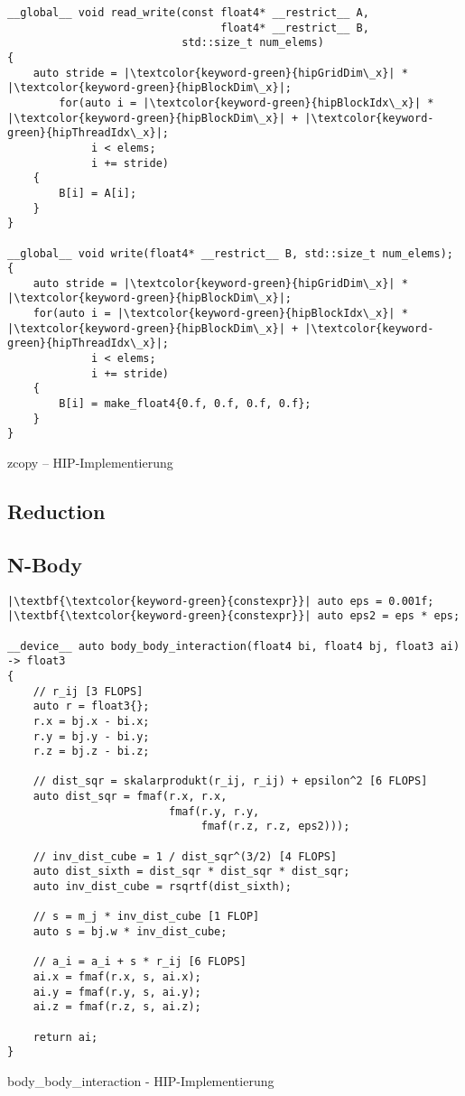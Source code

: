 \begin{code}
    \begin{verbatim}
__global__ void read_write(const float4* __restrict__ A,
                                 float4* __restrict__ B,
                           std::size_t num_elems)
{
    auto stride = |\textcolor{keyword-green}{hipGridDim\_x}| * |\textcolor{keyword-green}{hipBlockDim\_x}|;
        for(auto i = |\textcolor{keyword-green}{hipBlockIdx\_x}| * |\textcolor{keyword-green}{hipBlockDim\_x}| + |\textcolor{keyword-green}{hipThreadIdx\_x}|;
             i < elems;
             i += stride)
    {
        B[i] = A[i];
    }
}

__global__ void write(float4* __restrict__ B, std::size_t num_elems);
{
    auto stride = |\textcolor{keyword-green}{hipGridDim\_x}| * |\textcolor{keyword-green}{hipBlockDim\_x}|;
    for(auto i = |\textcolor{keyword-green}{hipBlockIdx\_x}| * |\textcolor{keyword-green}{hipBlockDim\_x}| + |\textcolor{keyword-green}{hipThreadIdx\_x}|;
             i < elems;
             i += stride)
    {
        B[i] = make_float4{0.f, 0.f, 0.f, 0.f};
    }
}
    \end{verbatim}
    \caption{zcopy -- HIP-Implementierung}
    \label{anhang:hip:zcopy}
\end{code}

\subsection{Reduction}
\subsection{N-Body}

\begin{code}
    \begin{verbatim}
|\textbf{\textcolor{keyword-green}{constexpr}}| auto eps = 0.001f;
|\textbf{\textcolor{keyword-green}{constexpr}}| auto eps2 = eps * eps;

__device__ auto body_body_interaction(float4 bi, float4 bj, float3 ai)
-> float3
{
    // r_ij [3 FLOPS]
    auto r = float3{};
    r.x = bj.x - bi.x;
    r.y = bj.y - bi.y;
    r.z = bj.z - bi.z;

    // dist_sqr = skalarprodukt(r_ij, r_ij) + epsilon^2 [6 FLOPS]
    auto dist_sqr = fmaf(r.x, r.x,
                         fmaf(r.y, r.y,
                              fmaf(r.z, r.z, eps2)));

    // inv_dist_cube = 1 / dist_sqr^(3/2) [4 FLOPS]
    auto dist_sixth = dist_sqr * dist_sqr * dist_sqr;
    auto inv_dist_cube = rsqrtf(dist_sixth);

    // s = m_j * inv_dist_cube [1 FLOP]
    auto s = bj.w * inv_dist_cube;

    // a_i = a_i + s * r_ij [6 FLOPS]
    ai.x = fmaf(r.x, s, ai.x);
    ai.y = fmaf(r.y, s, ai.y);
    ai.z = fmaf(r.z, s, ai.z);

    return ai;
}
    \end{verbatim}
    \caption{body\_body\_interaction - HIP-Implementierung}
    \label{anhang:hip:bodybodyinteraction}
\end{code}

